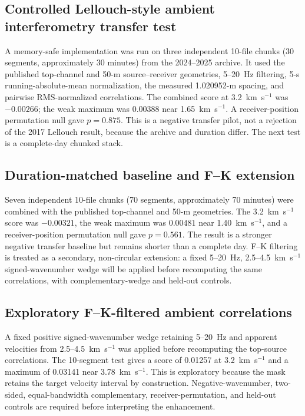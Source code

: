 \documentclass[11pt]{article}
\begin{document}
\subsection{Controlled Lellouch-style ambient interferometry transfer test}
A memory-safe implementation was run on three independent 10-file chunks (30 segments, approximately 30 minutes) from the 2024--2025 archive. It used the published top-channel and 50-m source--receiver geometries, 5--20~Hz filtering, 5-s running-absolute-mean normalization, the measured 1.020952-m spacing, and pairwise RMS-normalized correlations. The combined score at 3.2~km~s$^{-1}$ was $-0.00266$; the weak maximum was $0.00388$ near 1.65~km~s$^{-1}$. A receiver-position permutation null gave $p=0.875$. This is a negative transfer pilot, not a rejection of the 2017 Lellouch result, because the archive and duration differ. The next test is a complete-day chunked stack.


\subsection{Duration-matched baseline and F--K extension}
Seven independent 10-file chunks (70 segments, approximately 70 minutes) were combined with the published top-channel and 50-m geometries. The 3.2~km~s$^{-1}$ score was $-0.00321$, the weak maximum was $0.00481$ near 1.40~km~s$^{-1}$, and a receiver-position permutation null gave $p=0.561$. The result is a stronger negative transfer baseline but remains shorter than a complete day. F--K filtering is treated as a secondary, non-circular extension: a fixed 5--20~Hz, 2.5--4.5~km~s$^{-1}$ signed-wavenumber wedge will be applied before recomputing the same correlations, with complementary-wedge and held-out controls.


\subsection{Exploratory F--K-filtered ambient correlations}
A fixed positive signed-wavenumber wedge retaining 5--20~Hz and apparent velocities from 2.5--4.5~km~s$^{-1}$ was applied before recomputing the top-source correlations. The 10-segment test gives a score of 0.01257 at 3.2~km~s$^{-1}$ and a maximum of 0.03141 near 3.78~km~s$^{-1}$. This is exploratory because the mask retains the target velocity interval by construction. Negative-wavenumber, two-sided, equal-bandwidth complementary, receiver-permutation, and held-out controls are required before interpreting the enhancement.
\end{document}
